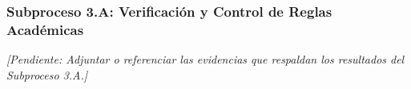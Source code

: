 \subsubsection{Subproceso 3.A: Verificación y Control de Reglas Académicas}

\textit{[Pendiente: Adjuntar o referenciar las evidencias que respaldan los resultados del Subproceso 3.A.]}

